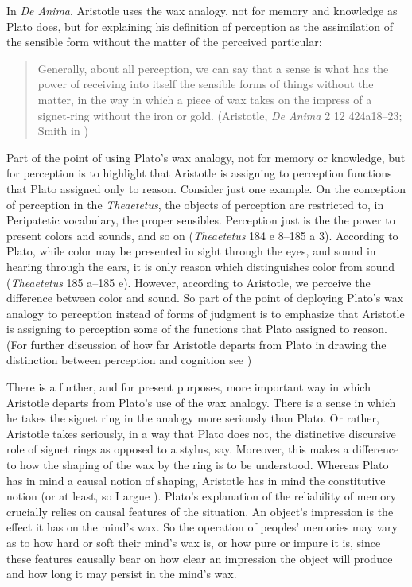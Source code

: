 In \emph{De Anima}, Aristotle uses the wax analogy, not for memory and knowledge as Plato does, but for explaining his definition of perception as the assimilation of the sensible form without the matter of the perceived particular:
\begin{quote}
	Generally, about all perception, we can say that a sense is what has the power of receiving into itself the sensible forms of things without the matter, in the way in which a piece of wax takes on the impress of a signet-ring without the iron or gold. (Aristotle, \emph{De Anima} 2 12 424a18–23; Smith in \citealt[42--43]{Barnes:1984uq})
\end{quote}
Part of the point of using Plato's wax analogy, not for memory or knowledge, but for perception is to highlight that Aristotle is assigning to perception functions that Plato assigned only to reason. Consider just one example. On the conception of perception in the \emph{Theaetetus}, the objects of perception are restricted to, in Peripatetic vocabulary, the proper sensibles. Perception just is the the power to present colors and sounds, and so on (\emph{Theaetetus} 184 e 8--185 a 3). According to Plato, while color may be presented in sight through the eyes, and sound in hearing through the ears, it is only reason which distinguishes color from sound (\emph{Theaetetus} 185 a--185 e). However, according to Aristotle, we perceive the difference between color and sound. So part of the point of deploying Plato's wax analogy to perception instead of forms of judgment is to emphasize that Aristotle is assigning to perception some of the functions that Plato assigned to reason. (For further discussion of how far Aristotle departs from Plato in drawing the distinction between perception and cognition see \citealt{Sorabji:1971fr,Sorabji:2003fk,Kalderon:2015fr})

There is a further, and for present purposes, more important way in which Aristotle departs from Plato's use of the wax analogy. There is a sense in which he takes the signet ring in the analogy more seriously than Plato. Or rather, Aristotle takes seriously, in a way that Plato does not, the distinctive discursive role of signet rings as opposed to a stylus, say. Moreover, this makes a difference to how the shaping of the wax by the ring is to be understood. Whereas Plato has in mind a causal notion of shaping, Aristotle has in mind the constitutive notion (or at least, so I argue \citealt[chapter 9]{Kalderon:2015fr}). Plato’s explanation of the reliability of memory crucially relies on causal features of the situation. An object’s impression is the effect it has on the mind’s wax. So the operation of peoples' memories may vary as to how hard or soft their mind's wax is, or how pure or impure it is, since these features causally bear on how clear an impression the object will produce and how long it may persist in the mind's wax. 

